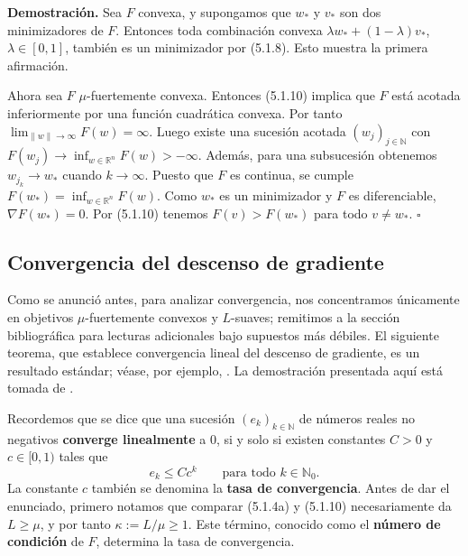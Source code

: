\documentclass[11pt]{report}
\theoremstyle{definition}
\theoremstyle{plain}
\numberwithin{equation}{section}
\begin{document}
\textbf{Demostración.} Sea \(F\) convexa, y supongamos que \(w_*\) y \(v_*\) son dos minimizadores de \(F\). Entonces toda combinación convexa \(\lambda w_*+(1-\lambda)v_*\), \(\lambda\in[0,1]\), también es un minimizador por (5.1.8). Esto muestra la primera afirmación.

Ahora sea \(F\) \(\mu\)-fuertemente convexa. Entonces (5.1.10) implica que \(F\) está acotada inferiormente por una función cuadrática convexa. Por tanto \(\lim_{\|w\|\to\infty}F(w)=\infty\). Luego existe una sucesión acotada \((w_j)_{j\in\mathbb{N}}\) con \(F(w_j)\to\inf_{w\in\mathbb{R}^n}F(w)>-\infty\). Además, para una subsucesión obtenemos \(w_{j_k}\to w_*\) cuando \(k\to\infty\). Puesto que \(F\) es continua, se cumple \(F(w_*)=\inf_{w\in\mathbb{R}^n}F(w)\). Como \(w_*\) es un minimizador y \(F\) es diferenciable, \(\nabla F(w_*)=0\). Por (5.1.10) tenemos \(F(v)>F(w_*)\) para todo \(v\neq w_*\). \(\square\)

\subsection{Convergencia del descenso de gradiente}

Como se anunció antes, para analizar convergencia, nos concentramos únicamente en objetivos \(\mu\)-fuertemente convexos y \(L\)-suaves; remitimos a la sección bibliográfica para lecturas adicionales bajo supuestos más débiles. El siguiente teorema, que establece convergencia lineal del descenso de gradiente, es un resultado estándar; véase, por ejemplo, \cite{nesterov-2018,beck-2017,bubeck-2015}. La demostración presentada aquí está tomada de \cite[Teorema 3.6]{garrigos-gower-2024}.

Recordemos que se dice que una sucesión \((e_k)_{k\in\mathbb{N}}\) de números reales no negativos \textbf{converge linealmente} a \(0\), si y solo si existen constantes \(C>0\) y \(c\in[0,1)\) tales que
\begin{equation*}
    e_k\leq Cc^k
    \qquad
    \text{para todo } k\in\mathbb{N}_0.
\end{equation*}
La constante \(c\) también se denomina la \textbf{tasa de convergencia}. Antes de dar el enunciado, primero notamos que comparar (5.1.4a) y (5.1.10) necesariamente da \(L\geq \mu\), y por tanto \(\kappa:=L/\mu\geq 1\). Este término, conocido como el \textbf{número de condición} de \(F\), determina la tasa de convergencia.
\end{document}
